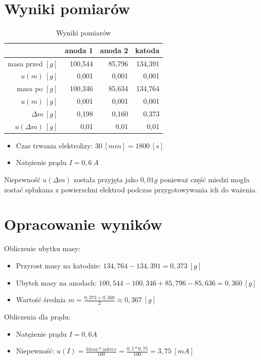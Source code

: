 \documentclass[a4paper,10pt,twoside]{article}
\begin{document}
\section{Wyniki pomiarów}
\begin{table}[!htb]
\centering
\caption{Wyniki pomiarów}
\def\arraystretch{1.5}
\begin{tabular}{|r|r|r|r|}
\hline
\multicolumn{1}{|l|}{} & \multicolumn{1}{c|}{anoda 1} & \multicolumn{1}{c|}{anoda 2} & \multicolumn{1}{c|}{katoda} \\ \hline
masa przed $[g]$       & 100,544                      & 85,796                       & 134,391                     \\ \hline
$u(m)~[g]$             & 0,001                        & 0,001                        & 0,001                       \\ \hline
masa po $[g]$          & 100,346                      & 85,634                       & 134,764                     \\ \hline
$u(m)~[g]$             & 0,001                        & 0,001                        & 0,001                       \\ \hline
$\Delta m~[g]$         & 0,198                        & 0,160                        & 0,373                       \\ \hline
$u(\Delta m)~[g]$      & 0,01                         & 0,01                         & 0,01                        \\ \hline
\end{tabular}
\end{table}
\begin{itemize}
\item Czas trwania elektrolizy: $30~[min]=1800~[s]$
\item Natężenie prądu $I=0,6~A$
\end{itemize}
Niepewność $u(\Delta m)$ została przyjęta jako $0,01g$ ponieważ część miedzi mogła zostać spłukana z powierzchni elektrod
podczas przygotowywania ich do ważenia.

\newpage
\section{Opracowanie wyników}
\noindent
Obliczenie ubytku masy:
\begin{itemize}
\item Przyrost masy na katodzie: $134,764 - 134,391 = 0,373~[g]$
\item Ubytek masy na anodach: $100,544-100,346 + 85,796-85,636 = 0,360~[g]$
\item Wartość średnia $m= \frac{0,373+0,360}{2} \approx 0,367~[g]$
\end{itemize}
\vspace{5pt}
Obliczenia dla prądu:
\begin{itemize}
\item Natężenie prądu $I = 0,6A$
\item Niepewność: $u(I) = \frac{klasa * zakres}{100} = \frac{0,5*0,75}{100}=3,75~[mA]$
\end{itemize}
\end{document}
